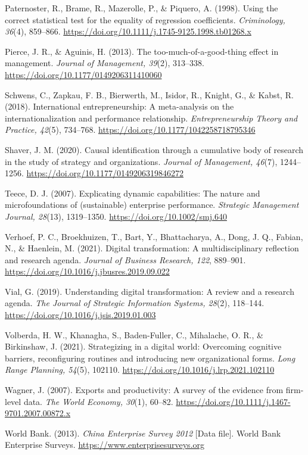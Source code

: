 \documentclass[12pt,a4paper]{article}
\begin{document}
Paternoster, R., Brame, R., Mazerolle, P., \& Piquero, A. (1998). Using
the correct statistical test for the equality of regression
coefficients. \emph{Criminology, 36}(4), 859--866.
\url{https://doi.org/10.1111/j.1745-9125.1998.tb01268.x}

Pierce, J. R., \& Aguinis, H. (2013). The too-much-of-a-good-thing
effect in management. \emph{Journal of Management, 39}(2), 313--338.
\url{https://doi.org/10.1177/0149206311410060}

Schwens, C., Zapkau, F. B., Bierwerth, M., Isidor, R., Knight, G., \&
Kabst, R. (2018). International entrepreneurship: A meta-analysis on the
internationalization and performance relationship.
\emph{Entrepreneurship Theory and Practice, 42}(5), 734--768.
\url{https://doi.org/10.1177/1042258718795346}

Shaver, J. M. (2020). Causal identification through a cumulative body of
research in the study of strategy and organizations. \emph{Journal of
Management, 46}(7), 1244--1256.
\url{https://doi.org/10.1177/0149206319846272}

Teece, D. J. (2007). Explicating dynamic capabilities: The nature and
microfoundations of (sustainable) enterprise performance.
\emph{Strategic Management Journal, 28}(13), 1319--1350.
\url{https://doi.org/10.1002/smj.640}

Verhoef, P. C., Broekhuizen, T., Bart, Y., Bhattacharya, A., Dong, J.
Q., Fabian, N., \& Haenlein, M. (2021). Digital transformation: A
multidisciplinary reflection and research agenda. \emph{Journal of
Business Research, 122}, 889--901.
\url{https://doi.org/10.1016/j.jbusres.2019.09.022}

Vial, G. (2019). Understanding digital transformation: A review and a
research agenda. \emph{The Journal of Strategic Information Systems,
28}(2), 118--144. \url{https://doi.org/10.1016/j.jsis.2019.01.003}

Volberda, H. W., Khanagha, S., Baden-Fuller, C., Mihalache, O. R., \&
Birkinshaw, J. (2021). Strategizing in a digital world: Overcoming
cognitive barriers, reconfiguring routines and introducing new
organizational forms. \emph{Long Range Planning, 54}(5), 102110.
\url{https://doi.org/10.1016/j.lrp.2021.102110}

Wagner, J. (2007). Exports and productivity: A survey of the evidence
from firm-level data. \emph{The World Economy, 30}(1), 60--82.
\url{https://doi.org/10.1111/j.1467-9701.2007.00872.x}

World Bank. (2013). \emph{China Enterprise Survey 2012} {[}Data file{]}.
World Bank Enterprise Surveys. \url{https://www.enterprisesurveys.org}
\end{document}
